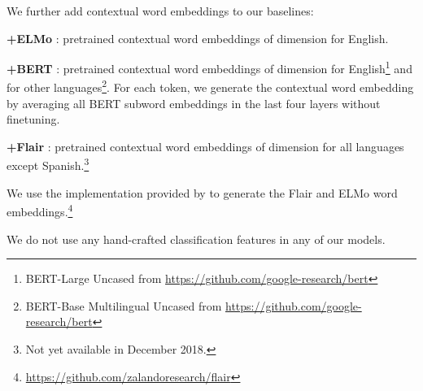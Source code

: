 \documentclass[11pt,a4paper]{article}
\newenvironment{citemize}{\begin{list}{}{\topsep=.5\smallskipamount\itemsep=0pt\parsep=1pt\labelwidth=.5em}}{\end{list}}
\begin{document}
We further add contextual word embeddings to our baselines:

\begin{citemize}
  \item \textbf{+ELMo} \cite{Peters2018}: pretrained contextual word embeddings
    of dimension  for English.
  \item \textbf{+BERT} \cite{BERT}: pretrained contextual word embeddings of dimension
     for English\footnote{BERT-Large Uncased from \url{https://github.com/google-research/bert}} and  for other languages\footnote{BERT-Base Multilingual Uncased from \url{https://github.com/google-research/bert}}. For each token, we generate the contextual word embedding
    by averaging all BERT subword embeddings in the last four layers \cite{BERT} without finetuning.
  \item \textbf{+Flair} \cite{Akbik}: pretrained contextual word embeddings of dimension
     for all languages except Spanish.\footnote{Not yet available in December
    2018.}
\end{citemize}

We use the implementation provided by \citet{Akbik} to generate the Flair and
ELMo word embeddings.\footnote{\url{https://github.com/zalandoresearch/flair}}

We do not use any hand-crafted classification features in any of our models.
\end{document}

